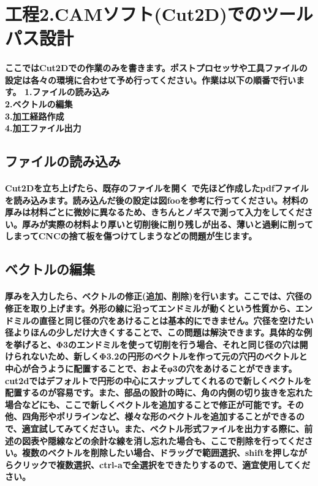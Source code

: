 \documentclass[b5paper, 9pt, twocolumn, titlepage,openany]{jsbook}%
\begin{document}

\section{工程2.CAMソフト(Cut2D)でのツールパス設計}
\paragraph{ここではCut2Dでの作業のみを書きます。ポストプロセッサや工具ファイルの設定は各々の環境に合わせて予め行ってください。作業は以下の順番で行います。
  1.ファイルの読み込み\\
  2.ベクトルの編集\\
  3.加工経路作成\\
  4.加工ファイル出力}

\subsection{ファイルの読み込み}
\paragraph{Cut2Dを立ち上げたら、既存のファイルを開く で先ほど作成したpdfファイルを読み込みます。読み込んだ後の設定は図fooを参考に行ってください。材料の厚みは材料ごとに微妙に異なるため、きちんとノギスで測って入力をしてください。厚みが実際の材料より厚いと切削後に削り残しが出る、薄いと過剰に削ってしまってCNCの捨て板を傷つけてしまうなどの問題が生じます。}


\subsection{ベクトルの編集}

\paragraph{厚みを入力したら、ベクトルの修正(追加、削除)を行います。ここでは、穴径の修正を取り上げます。外形の線に沿ってエンドミルが動くという性質から、エンドミルの直径と同じ径の穴をあけることは基本的にできません。穴径を空けたい径よりほんの少しだけ大きくすることで、この問題は解決できます。具体的な例を挙げると、Φ3のエンドミルを使って切削を行う場合、それと同じ径の穴は開けられないため、新しくΦ3.2の円形のベクトルを作って元の穴円のベクトルと中心が合うように配置することで、およそφ3の穴をあけることができます。cut2dではデフォルトで円形の中心にスナップしてくれるので新しくベクトルを配置するのが容易です。また、部品の設計の時に、角の内側の切り抜きを忘れた場合などにも、ここで新しくベクトルを追加することで修正が可能です。その他、四角形やポリラインなど、様々な形のベクトルを追加することができるので、適宜試してみてください。また、ベクトル形式ファイルを出力する際に、前述の図表や隠線などの余計な線を消し忘れた場合も、ここで削除を行ってください。複数のベクトルを削除したい場合、ドラッグで範囲選択、shiftを押しながらクリックで複数選択、ctrl-aで全選択をできたりするので、適宜使用してください。}
\end{document}
